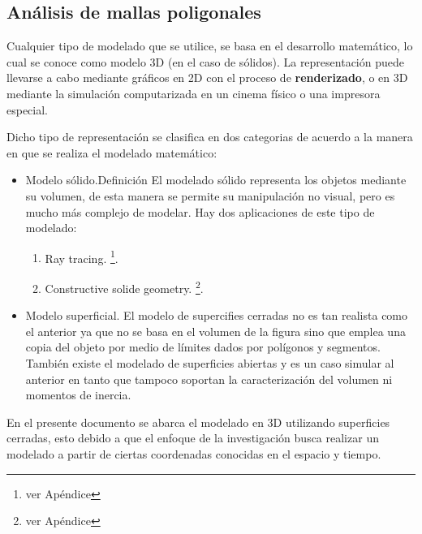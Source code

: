 \documentclass[11pt,letterpaper]{article}     %
\begin{document}

\subsection{An\' alisis de mallas poligonales}
Cualquier tipo de modelado que se utilice, se basa en el desarrollo matem\' atico, lo  cual se conoce como modelo 3D (en el caso de s\' olidos). La representaci\' on puede llevarse a cabo mediante gr\' aficos en 2D con el proceso de \textbf{renderizado}, o en 3D mediante la simulaci\' on computarizada en un cinema f\' isico o una impresora especial.

Dicho tipo de representaci\' on se clasifica en dos categorias de acuerdo a la manera en que se realiza el modelado matem\' atico:

\begin{itemize}
\item Modelo s\' olido.Definición
El modelado s\' olido representa los objetos mediante su volumen, de esta manera se permite su manipulaci\' on no visual, pero es mucho m\' as complejo de modelar. Hay dos aplicaciones de este tipo de modelado: 

\begin{enumerate}
	\item Ray tracing. \footnote{ver Ap\' endice }.
	\item Constructive solide geometry. \footnote{ver Ap\' endice }.
\end{enumerate}

\item Modelo superficial.
El modelo de supercifies cerradas no es tan realista como el anterior ya que no se basa en el volumen de la figura sino que emplea una copia del objeto por medio de l\' imites dados por pol\' igonos y segmentos.
Tambi\' en existe el modelado de superficies abiertas y es un caso simular al anterior en tanto que tampoco soportan la caracterizaci\' on del volumen ni momentos de inercia.
\end{itemize}
 
 En el presente documento se abarca el modelado en 3D utilizando superficies cerradas, esto debido a que el enfoque de la investigaci\' on busca realizar un modelado a partir de ciertas coordenadas conocidas en el espacio y tiempo.
 
\end{document}

